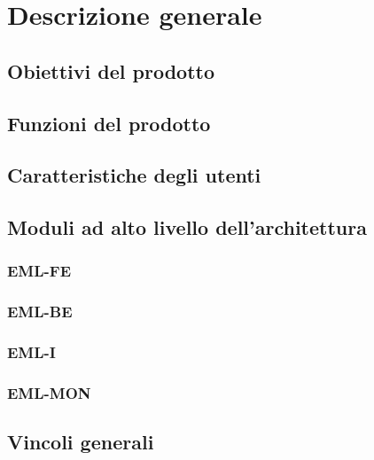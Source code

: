 \section{Descrizione generale}
\subsection{Obiettivi del prodotto}
\subsection{Funzioni del prodotto}
\subsection{Caratteristiche degli utenti}
\subsection{Moduli ad alto livello dell'architettura}
\subsubsection{EML-FE}
\subsubsection{EML-BE}
\subsubsection{EML-I}
\subsubsection{EML-MON}
\subsection{Vincoli generali}